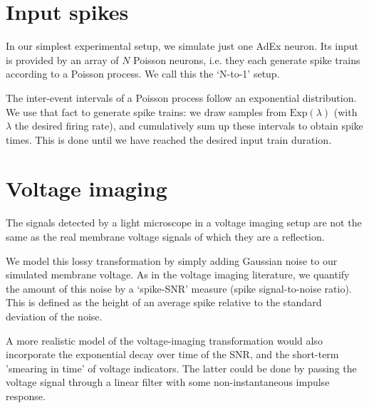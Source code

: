 \section{Input spikes}

In our simplest experimental setup, we simulate just one AdEx neuron.
Its input is provided by an array of $N$ Poisson neurons, i.e. they each generate spike trains according to a Poisson process. We call this the `N-to-1' setup.

The inter-event intervals of a Poisson process follow an exponential distribution.
We use that fact to generate spike trains: we draw samples from $\mathrm{Exp}(\lambda)$ (with $\lambda$ the desired firing rate), and cumulatively sum up these intervals  to obtain spike times. This is done until we have reached the desired input train duration.


\section{Voltage imaging}

The signals detected by a light microscope in a voltage imaging setup are not the same as the real membrane voltage signals of which they are a reflection.

We model this lossy transformation by simply adding Gaussian noise to our simulated membrane voltage. As in the voltage imaging literature, we quantify the amount of this  noise by a `spike-SNR' measure (spike signal-to-noise ratio). This is defined as the height of an average spike relative to the standard deviation of the noise.

A more realistic model of the voltage-imaging transformation would also incorporate the exponential decay over time of the SNR, and the short-term 'smearing in time' of voltage indicators. The latter could be done by passing the voltage signal through a linear filter with some non-instantaneous impulse response.
